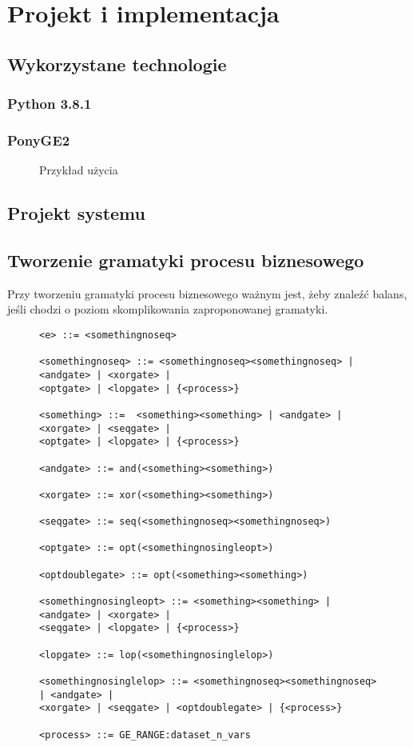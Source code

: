 \chapter{Projekt i implementacja}

\section{Wykorzystane technologie}
\subsection{Python 3.8.1}
\subsection{PonyGE2}
\cite{Fenton_2017}
\begin{figure}[h]
	\centering

	\caption{\label{fig:subcaption_example}Przykład użycia}
\end{figure}
\section{Projekt systemu}

\section{Tworzenie gramatyki procesu biznesowego}

Przy tworzeniu gramatyki procesu biznesowego ważnym jest, żeby znaleźć balans, jeśli chodzi o poziom skomplikowania zaproponowanej
gramatyki.  \cite{10.1007/978-3-540-69534-9_35}

\begin{figure}[!ht]
\lstset{caption=Gramatyka procesu biznesowego, captionpos=b}
\lstset{label=src:passive, frame=single}
\begin{lstlisting}
<e> ::= <somethingnoseq>

<somethingnoseq> ::= <somethingnoseq><somethingnoseq> | <andgate> | <xorgate> | 
<optgate> | <lopgate> | {<process>}

<something> ::=  <something><something> | <andgate> | <xorgate> | <seqgate> | 
<optgate> | <lopgate> | {<process>}

<andgate> ::= and(<something><something>)

<xorgate> ::= xor(<something><something>)

<seqgate> ::= seq(<somethingnoseq><somethingnoseq>)

<optgate> ::= opt(<somethingnosingleopt>)

<optdoublegate> ::= opt(<something><something>)

<somethingnosingleopt> ::= <something><something> | <andgate> | <xorgate> | 
<seqgate> | <lopgate> | {<process>}

<lopgate> ::= lop(<somethingnosinglelop>)

<somethingnosinglelop> ::= <somethingnoseq><somethingnoseq> | <andgate> | 
<xorgate> | <seqgate> | <optdoublegate> | {<process>}

<process> ::= GE_RANGE:dataset_n_vars
\end{lstlisting}
\end{figure}

